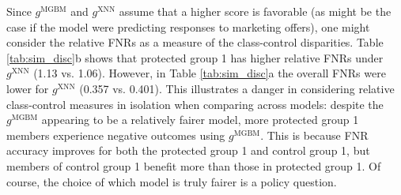 \documentclass[information,article,accept,moreauthors,pdftex]{Definitions/mdpi}
\begin{document}
{Since $g^{\text{MGBM}}$ and $g^{\text{XNN}}$ assume that a higher score is favorable (as might be the case if the model were predicting responses to marketing offers), one might consider the relative FNRs as a measure of the class-control disparities. Table \ref{tab:sim_disc}{b} shows that protected group 1 has higher relative FNRs under $g^{\text{XNN}}$ (1.13 vs. 1.06).  However, in Table \ref{tab:sim_disc}{a}  the overall FNRs were lower for  $g^{\text{XNN}}$ (0.357 vs. 0.401). This illustrates a danger in considering relative class-control measures in isolation when comparing across models: despite the $g^\text{MGBM}$ appearing to be a relatively fairer model, more protected group 1 members experience negative outcomes using $g^{\text{MGBM}}$. This is because FNR accuracy improves for both the protected group 1 and control group 1, but members of control group 1 benefit more than those in protected group 1.  Of course, the choice of which model is truly fairer is a policy question.

}
\end{document}
